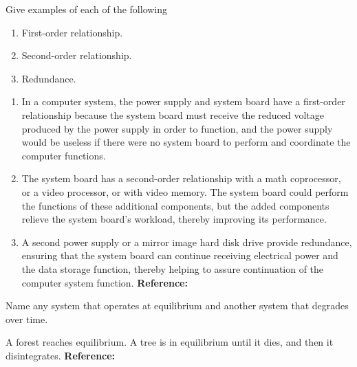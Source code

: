 \begin{exercises}
    \begin{exercise} 
    \label{sea-1-13}
        Give examples of each of the following
        \begin{enumerate}[label=\alph*)]
            \item First-order relationship.
            \item Second-order relationship.
            \item Redundance.
        \end{enumerate}
    \end{exercise}
    \begin{solution}
        \begin{enumerate}[label=\alph*)]
            \item In a computer system, the power supply and system board have a first-order relationship because the system board must receive the reduced voltage produced by the power supply in order to function, and the power supply would be useless if there were no system board to perform and coordinate the computer functions. 
            \item The system board has a second-order relationship with a math coprocessor, or a video processor, or with video memory. The system board could perform the functions of these additional components, but the added components relieve the system board’s workload, thereby improving its performance.
            \item  A second power supply or a mirror image hard disk drive provide redundance, ensuring that the system board can continue receiving electrical power and the data storage function, thereby helping to assure continuation of the computer system function. \textbf{Reference:}
        \end{enumerate}
    \end{solution}
    
    \begin{exercise} 
    \label{sea-1-16}
        Name any system that operates at equilibrium and another system that degrades over time.
    \end{exercise}
    \begin{solution}
        A forest reaches equilibrium. A tree is in equilibrium until it dies, and then it disintegrates. \textbf{Reference:}
    \end{solution}
    

\end{exercises}
